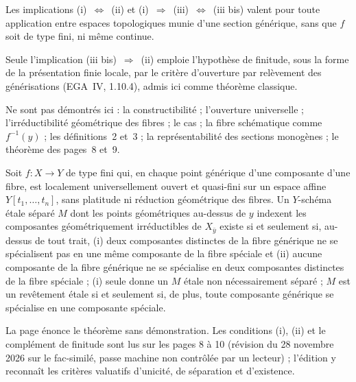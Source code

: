 \begin{remarque}
Les implications (i)~$\Leftrightarrow$~(ii) et (i)~$\Rightarrow$~(iii)~$\Leftrightarrow$~(iii bis) valent pour toute application entre espaces topologiques munie d'une section générique, sans que $f$ soit de type fini, ni même continue.
\end{remarque}

\begin{remarque}
Seule l'implication (iii bis)~$\Rightarrow$~(ii) emploie l'hypothèse de finitude, sous la forme de la présentation finie locale, par le critère d'ouverture par relèvement des générisations (EGA~IV, 1.10.4), admis ici comme théorème classique.
\end{remarque}

Ne sont pas démontrés ici : la constructibilité ; l'ouverture universelle ; l'irréductibilité géométrique des fibres ; le cas  ; la fibre schématique comme $f^{-1}(y)$ ; les définitions~2 et~3 ; la représentabilité des sections monogènes ; le théorème des pages~8 et~9.

\begin{encadre}
\begin{theoreme*}\nonverifie
Soit $f : X \to Y$ de type fini qui, en chaque point générique d'une composante d'une fibre, est localement universellement ouvert et quasi-fini sur un espace affine $Y[t_1, \ldots, t_n]$, sans platitude ni réduction géométrique des fibres. Un $Y$-schéma étale séparé $M$ dont les points géométriques au-dessus de $y$ indexent les composantes géométriquement irréductibles de $X_{\bar y}$ existe si et seulement si, au-dessus de tout trait, (i) deux composantes distinctes de la fibre générique ne se spécialisent pas en une même composante de la fibre spéciale et (ii) aucune composante de la fibre générique ne se spécialise en deux composantes distinctes de la fibre spéciale ; (i) seule donne un $M$ étale non nécessairement séparé ; $M$ est un revêtement étale si et seulement si, de plus, toute composante générique se spécialise en une composante spéciale.
\end{theoreme*}
\end{encadre}
{\small La page énonce le théorème sans démonstration. Les conditions (i), (ii) et le complément de finitude sont lus sur les pages 8 à 10 (révision du 28 novembre 2026 sur le fac-similé, passe machine non contrôlée par un lecteur) ; l'édition y reconnaît les critères valuatifs d'unicité, de séparation et d'existence.\par}
